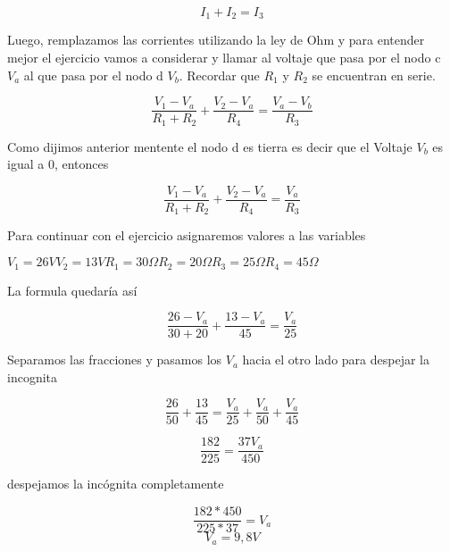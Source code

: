 \begin{example}
\begin {equation*}
I_1 + I_2 = I_3
\end {equation*}

Luego, remplazamos las corrientes utilizando la ley de Ohm y para entender mejor el ejercicio vamos a considerar y llamar al voltaje que pasa por el nodo c $V_a$ al que pasa por el nodo d $V_b$. Recordar que $R_1$ y $R_2$ se encuentran en serie.

\begin {equation*}
 \frac{V_1 - V_a}{R_1+R_2} + \frac{V_2 - V_a}{R_4}= \frac{V_a - V_b}{R_3}
\end {equation*}

Como dijimos anterior mentente el nodo d es tierra es decir que el Voltaje $V_b$ es igual a 0, entonces

\begin {equation*}
 \frac{V_1 - V_a}{R_1+R_2} + \frac{V_2 - V_a}{R_4}= \frac{V_a }{R_3}
\end {equation*}

Para continuar con el ejercicio asignaremos valores a las variables

\hspace{1 cm}$V_1=26 V$\hspace{1 cm}$V_2=13 V$\hspace{1 cm}$R_1=30\Omega$\hspace{1 cm}$R_2=20 \Omega$\hspace{1 cm}$R_3=25 \Omega$\hspace{1 cm}$R_4=45 \Omega$

La formula quedaría así

\begin {equation*}
 \frac{26 - V_a}{30+20} + \frac{13 - V_a}{45}= \frac{V_a }{25}
\end {equation*}

Separamos las fracciones y pasamos los $V_a$ hacia el otro lado para despejar la incognita

\begin {equation*}
 \frac{26 }{50} + \frac{13 }{45}= \frac{V_a }{25} + \frac{V_a }{50} + \frac{V_a }{45}
\end {equation*}

\begin {equation*}
 \frac{182}{225} = \frac{37V_a}{450} 
\end {equation*}

despejamos la incógnita completamente

\begin {equation*}
 \frac{182*450}{225*37} = V_a
\end {equation*}
\begin {equation*}
 V_a =9,8 V
\end {equation*}


\end{example}
